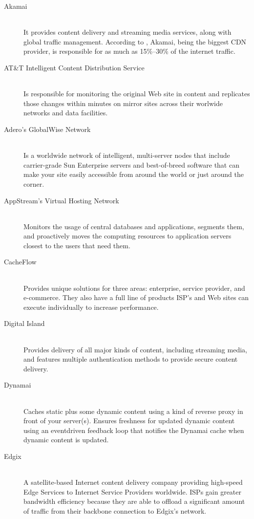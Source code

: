 \documentclass{llncs}
\begin{document}
\begin{description}
\item[Akamai] \hfill \\
It provides content delivery and streaming media services,
along with global traffic management. According to \cite{reuters}, 
Akamai, being the biggest CDN provider, 
is responsible for as much as 15\%--30\% of the internet traffic.

\item[AT\&T Intelligent Content Distribution Service] \hfill \\
Is responsible for monitoring the original Web site in content and replicates
those changes within minutes on mirror sites across their worlwide
networks and data facilities.

\item[Adero's GlobalWise Network] \hfill \\
Is a worldwide network of intelligent, multi-server
nodes that include carrier-grade Sun Enterprise servers and best-of-breed
software that can make your site easily accessible from around the world or just
around the corner.

\item[AppStream's Virtual Hosting Network] \hfill \\
Monitors the usage of central databases and
applications, segments them, and proactively moves the computing resources to
application servers closest to the users that need them.

\item[CacheFlow] \hfill \\
Provides unique solutions for three areas: enterprise, service provider,
and e-commerce. They also have a full line of products ISP's and Web sites can
execute individually to increase performance.

\item[Digital Island] \hfill \\
Provides delivery of all major kinds of content, including streaming
media, and features multiple authentication methods to provide secure content
delivery.
 
\item[Dynamai] \hfill \\
Caches static plus some dynamic content using a kind of reverse proxy in front of
your server(s). Ensures freshness for updated dynamic content using an eventdriven
feedback loop that notifies the Dynamai cache when dynamic content is
updated.

\item[Edgix] \hfill \\
A satellite-based Internet content delivery company providing high-speed Edge
Services to Internet Service Providers worldwide. ISPs gain greater bandwidth
efficiency because they are able to offload a significant amount of traffic from
their backbone connection to Edgix's network.


\end{description}
\end{document}
